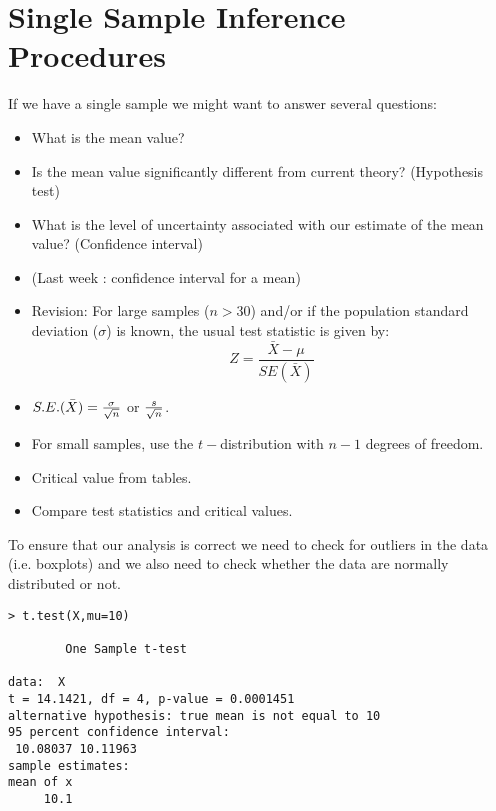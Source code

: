 \section{Single Sample Inference Procedures}
If we have a single sample we might want to answer several
questions:
\begin{itemize}
\item What is the mean value? \item Is the mean value
significantly different from current theory? (Hypothesis test)
\item What is the level of uncertainty associated with our
estimate of the mean value? (Confidence interval)
\end{itemize}

\begin{itemize}
\item (Last week : confidence interval for a mean) \item Revision:
For large samples ($n > 30$) and/or if the population standard
deviation ($\sigma$) is known, the usual test statistic is given
by: \[Z =\frac{\bar{X} - \mu}{SE(\bar{X})}\]

\item $S.E.(\bar{X}) = { \sigma \over \sqrt{n}} $ or ${s \over \sqrt{n}}$. 
\item For small samples, use the $t-$distribution with $n-1$ degrees of freedom.
\item Critical value from tables.
\item Compare test statistics and critical values.
\end{itemize}

To ensure that our analysis is correct we need to check for
outliers in the data (i.e. boxplots) and we also need to check
whether the data are normally distributed or not.

\begin{framed}
\begin{verbatim}
> t.test(X,mu=10)

        One Sample t-test

data:  X 
t = 14.1421, df = 4, p-value = 0.0001451
alternative hypothesis: true mean is not equal to 10 
95 percent confidence interval:
 10.08037 10.11963 
sample estimates:
mean of x 
     10.1 
\end{verbatim}
\end{framed}
